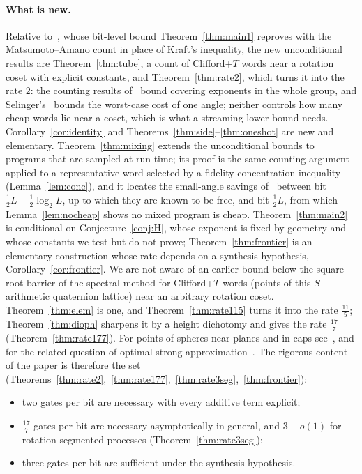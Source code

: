 \documentclass[aps,prx,twocolumn,superscriptaddress,nofootinbib,longbibliography]{revtex4-2}
\theoremstyle{plain}
\theoremstyle{definition}
\theoremstyle{remark}
\begin{document}
\paragraph{What is new.} Relative to~\cite{Paper1}, whose bit-level bound Theorem~\ref{thm:main1} reproves with the Matsumoto--Amano count in place of Kraft's inequality, the new unconditional results are Theorem~\ref{thm:tube}, a count of Clifford+$T$ words near a rotation coset with explicit constants, and Theorem~\ref{thm:rate2}, which turns it into the rate $2$: the counting results of~\cite{PS18} bound covering exponents in the whole group, and Selinger's~\cite[Thm.~30]{Selinger15} bounds the worst-case cost of one angle; neither controls how many cheap words lie near a coset, which is what a streaming lower bound needs. Corollary~\ref{cor:identity} and Theorems~\ref{thm:side}--\ref{thm:oneshot} are new and elementary. Theorem~\ref{thm:mixing} extends the unconditional bounds to programs that are sampled at run time; its proof is the same counting argument applied to a representative word selected by a fidelity-concentration inequality (Lemma~\ref{lem:conc}), and it locates the small-angle savings of~\cite{Bothe} between bit $\tfrac12L-\tfrac12\log_2L$, up to which they are known to be free, and bit $\tfrac12L$, from which Lemma~\ref{lem:nocheap} shows no mixed program is cheap. Theorem~\ref{thm:main2} is conditional on Conjecture~\ref{conj:H}, whose exponent is fixed by geometry and whose constants we test but do not prove; Theorem~\ref{thm:frontier} is an elementary construction whose rate depends on a synthesis hypothesis, Corollary~\ref{cor:frontier}. We are not aware of an earlier bound below the square-root barrier of the spectral method for Clifford+$T$ words (points of this $S$-arithmetic quaternion lattice) near an arbitrary rotation coset. Theorem~\ref{thm:elem} is one, and Theorem~\ref{thm:rate115} turns it into the rate $\tfrac{11}5$; Theorem~\ref{thm:dioph} sharpens it by a height dichotomy and gives the rate $\tfrac{17}7$ (Theorem~\ref{thm:rate177}). For points of spheres near planes and in caps see~\cite{BourgainRudnick}, and for the related question of optimal strong approximation~\cite{BKS,Sardari}. The rigorous content of the paper is therefore the set (Theorems~\ref{thm:rate2},~\ref{thm:rate177},~\ref{thm:rate3seg},~\ref{thm:frontier}):
\begin{itemize}\setlength\itemsep{0pt}
\item two gates per bit are necessary with every additive term explicit;
\item $\tfrac{17}7$ gates per bit are necessary asymptotically in general, and $3-o(1)$ for rotation-segmented processes (Theorem~\ref{thm:rate3seg});
\item three gates per bit are sufficient under the synthesis hypothesis.
\end{itemize}
\end{document}
